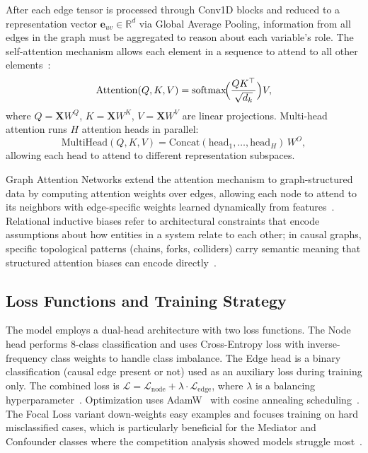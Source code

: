 After each edge tensor is processed through Conv1D blocks and reduced to a representation vector $\mathbf{e}_{uv}\in\mathbb{R}^d$ via Global Average Pooling, information from all edges in the graph must be aggregated to reason about each variable's role. The self-attention mechanism allows each element in a sequence to attend to all other elements~\cite{vaswani2017attention}:
\begin{equation}
\mathrm{Attention}(Q,K,V)=\mathrm{softmax}\!\Bigl(\frac{QK^\top}{\sqrt{d_k}}\Bigr)V,
\label{eq:attention}
\end{equation}
where $Q=\mathbf{X}W^Q$, $K=\mathbf{X}W^K$, $V=\mathbf{X}W^V$ are linear projections. Multi-head attention runs $H$ attention heads in parallel:
\begin{equation}
\mathrm{MultiHead}(Q,K,V)=\mathrm{Concat}(\mathrm{head}_1,\ldots,\mathrm{head}_H)\,W^O,
\label{eq:multihead}
\end{equation}
allowing each head to attend to different representation subspaces.

Graph Attention Networks extend the attention mechanism to graph-structured data by computing attention weights over edges, allowing each node to attend to its neighbors with edge-specific weights learned dynamically from features~\cite{velickovic2018gat}. Relational inductive biases refer to architectural constraints that encode assumptions about how entities in a system relate to each other; in causal graphs, specific topological patterns (chains, forks, colliders) carry semantic meaning that structured attention biases can encode directly~\cite{battaglia2018relational}.

\subsection{Loss Functions and Training Strategy}
\label{sec:loss_training}

The model employs a dual-head architecture with two loss functions. The Node head performs 8-class classification and uses Cross-Entropy loss with inverse-frequency class weights to handle class imbalance. The Edge head is a binary classification (causal edge present or not) used as an auxiliary loss during training only. The combined loss is $\mathcal{L}=\mathcal{L}_{\mathrm{node}}+\lambda\cdot\mathcal{L}_{\mathrm{edge}}$, where $\lambda$ is a balancing hyperparameter~\cite{lin2017focalloss}. Optimization uses AdamW~\cite{loshchilov2019adamw} with cosine annealing scheduling~\cite{loshchilov2017sgdr}. The Focal Loss variant down-weights easy examples and focuses training on hard misclassified cases, which is particularly beneficial for the Mediator and Confounder classes where the competition analysis showed models struggle most~\cite{olivetti2025adialab}.

